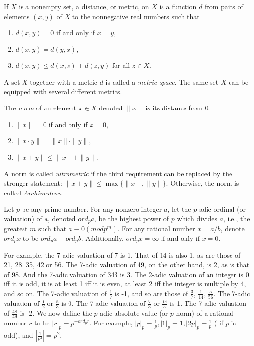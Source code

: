 \documentclass{llncs}
\begin{document}
If $X$ is a nonempty set, a distance, or {metric}, on $X$ is a function $d$ from pairs of elements $(x,y)$ of $X$ to the nonnegative real numbers such that
\begin{enumerate}
\item $d(x,y) = 0$ if and only if $x = y$,\\
\item $d(x,y) = d(y,x)$,\\
\item $d(x,y) \leq d(x,z) + d(z,y)$ for all $z \in X$.
\end{enumerate}

A set $X$ together with a metric $d$ is called a {\em metric space}. The same set $X$ can be equipped with several different metrics.


The {\em norm} of an element $x \in X$ denoted $\parallel x \parallel$ is its distance from $0$:
\begin{enumerate}
\item $\parallel x \parallel = 0$ if and only if $x = 0$,\\
\item $\parallel x \cdot y \parallel = \parallel x \parallel \cdot \parallel y \parallel $,\\
\item $\parallel x+y \parallel  \leq \parallel x \parallel  + \parallel y \parallel $.
\end{enumerate}

A norm  is called {\em ultrametric}  if the third requirement can be replaced by the stronger statement:
$\parallel x+y \parallel  \leq \max \{\parallel x \parallel  , \parallel y \parallel \}$.
Otherwise, the norm is called {\em Archimedean}.

\begin{definition}
Let $p$ be any prime number. For any nonzero integer $a$, let the $p$-adic ordinal (or valuation) of $a$, denoted $ord_p a$, be the highest power of $p$ which divides $a$, i.e., the greatest $m$ such that $a \equiv 0 (mod p^{m})$. For any rational number $x = a/b$, denote $ord_p x$ to be $ord_p a - ord_p b$. Additionally, $ord_p x = \infty $ if and only if $x = 0$.
\end{definition}

For example, the 7-adic valuation of 7 is 1. That of 14 is also 1, as are those of 21, 28, 35, 42 or 56. The 7-adic valuation of 49, on the other hand, is 2, as is that of 98. And the 7-adic valuation of 343 is 3. The 2-adic valuation of an integer is 0 iff it is odd, it is at least 1 iff it is even, at least 2 iff the integer is multiple by 4, and so on. The 7-adic valuation of $\frac{1}{7}$ is -1, and so are those of $\frac{3}{7}$, $\frac{1}{14}$, $\frac{5}{56}$. The 7-adic valuation of $\frac{1}{2}$ or $\frac{8}{3}$ is 0. The 7-adic valuation of $\frac{7}{3}$ or $\frac{14}{5}$ is 1. The 7-adic valuation of $\frac{48}{49}$ is -2.
We now define the $p$-adic absolute value (or $p$-norm) of a rational number $r$ to be $|r|_p = p^{-ord_p r}$. For example, $|p|_p = \frac{1}{p} , |1|_p = 1, |2p|_p = \frac{1}{p}$ ( if $p$ is odd), and $|\frac{1}{p^2}| = p^2$.
\end{document}
